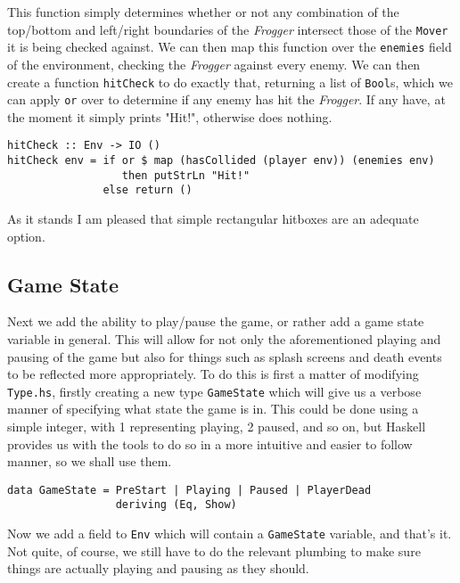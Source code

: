 \documentclass[12pt, a4paper]{report}
\begin{document}
This function simply determines whether or not any combination of the top/bottom and left/right boundaries of the \textit{Frogger} intersect those of the \verb|Mover| it is being checked against.
We can then map this function over the \verb|enemies| field of the environment, checking the \textit{Frogger} against every enemy.
We can then create a function \verb|hitCheck| to do exactly that, returning a list of \verb|Bool|s, which we can apply \verb|or| over to determine if any enemy has hit the \textit{Frogger}.
If any have, at the moment it simply prints "Hit!", otherwise does nothing.

\begin{lstlisting}
hitCheck :: Env -> IO ()
hitCheck env = if or $ map (hasCollided (player env)) (enemies env)
                  then putStrLn "Hit!"
               else return ()
\end{lstlisting}

As it stands I am pleased that simple rectangular hitboxes are an adequate option.

\subsection{Game State}

Next we add the ability to play/pause the game, or rather add a game state variable in general.
This will allow for not only the aforementioned playing and pausing of the game but also for things such as splash screens and death events to be reflected more appropriately.
To do this is first a matter of modifying \verb|Type.hs|, firstly creating a new type \verb|GameState| which will give us a verbose manner of specifying what state the game is in.
This could be done using a simple integer, with 1 representing playing, 2 paused, and so on, but Haskell provides us with the tools to do so in a more intuitive and easier to follow manner, so we shall use them.

\begin{lstlisting}
data GameState = PreStart | Playing | Paused | PlayerDead
                 deriving (Eq, Show)
\end{lstlisting}

Now we add a field to \verb|Env| which will contain a \verb|GameState| variable, and that's it.
Not quite, of course, we still have to do the relevant plumbing to make sure things are actually playing and pausing as they should.

\par
\end{document}
